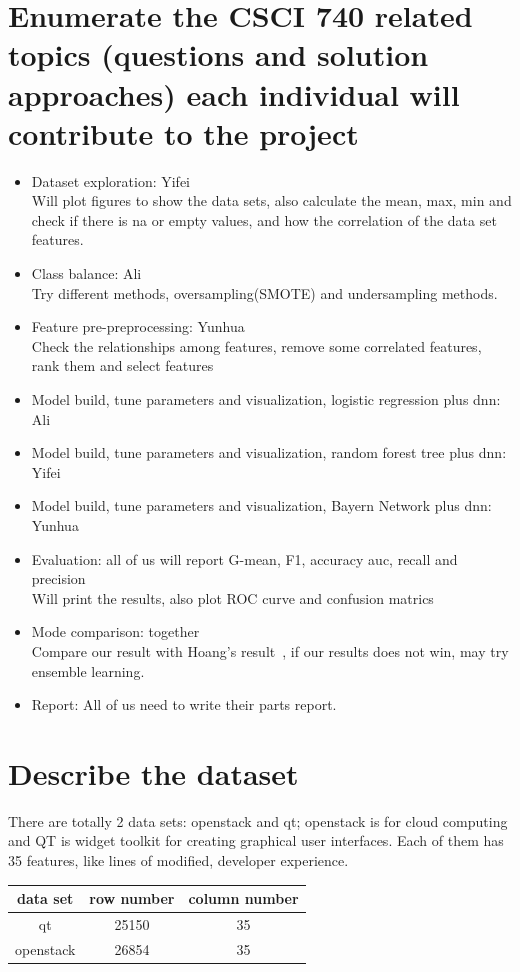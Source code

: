 \documentclass{article}
\begin{document}
\section{Enumerate the CSCI 740 related topics (questions and solution approaches) each individual will contribute
	to the project}
\begin{itemize}
	\item Dataset exploration: Yifei\\
	Will plot figures to show the data sets, also calculate the mean, max, min and check if there is na or empty values, and how the correlation of the data set features.
	\item Class balance: Ali  \\
	Try different methods, oversampling(SMOTE) and undersampling methods.
	\item Feature pre-preprocessing: Yunhua  \\
	Check the relationships among features, remove some correlated features, rank them and select features
	\item Model build, tune parameters and visualization, logistic regression plus dnn: Ali
	\item Model build, tune parameters and visualization, random forest tree plus dnn: Yifei
	\item Model build, tune parameters and visualization, Bayern Network plus dnn: Yunhua
	\item Evaluation: all of us will report G-mean, F1, accuracy auc, recall and precision \\
	Will print the results, also plot ROC curve and confusion matrics
	\item Mode comparison: together \\
	Compare our result with Hoang's result~\cite{hoang2019deepjit}, if our results does not win, may try ensemble learning.
	\item Report: All of us need to write their parts report.
\end{itemize}

\section{Describe the dataset}
There are totally 2 data sets: openstack and qt; openstack is for cloud computing and QT is widget toolkit for creating graphical user interfaces. Each of them has 35 features, like lines of modified, developer experience.  
\begin{center}
	\begin{tabular}{ c c c }
		data set & row number & column number \\ 
		\hline
		qt & 25150 & 35 \\ 
		openstack & 26854 & 35 \\  
		\hline
	\end{tabular}
\end{center}
\end{document}
